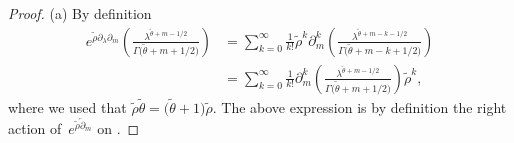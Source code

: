 \documentclass[pdftex]{sigma}
\numberwithin{equation}{section}
\begin{document}
\begin{proof}
(a)
By definition
\begin{align*}
e^{\widetilde{\rho}\partial_\lambda\partial_m}
\left(
\frac{\lambda^{\widetilde{\theta}+m-1/2}}{
\Gamma\big(\widetilde{\theta}+m+1/2\big)} \right) &=
\sum_{k=0}^\infty
\frac{1}{k!} \widetilde{\rho}^k \partial_m^k
\left(
\frac{\lambda^{\widetilde{\theta}+m-k-1/2}}{
\Gamma\big(\widetilde{\theta}+m-k+1/2\big)} \right) \\
&=
\sum_{k=0}^\infty
\frac{1}{k!} \partial_m^k
\left(
\frac{\lambda^{\widetilde{\theta}+m-1/2}}{
\Gamma\big(\widetilde{\theta}+m+1/2\big)} \right)
 \widetilde{\rho}^k,
\end{align*}
where we used that
$\widetilde{\rho} \widetilde{\theta} =
\big(\widetilde{\theta} +1\big) \widetilde{\rho}
$. The above expression is by definition the right action of~$e^{\widetilde{\rho} \overleftarrow{\partial}_m} $ on
.


\end{proof}
\end{document}
